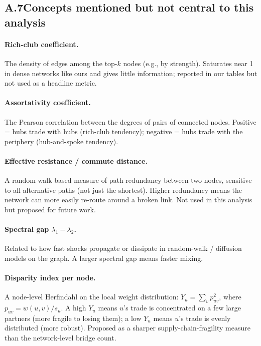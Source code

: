 \documentclass[11pt,a4paper]{article}
\begin{document}
\subsection*{A.7\quad Concepts mentioned but not central to this analysis}

\paragraph{Rich-club coefficient.}
The density of edges among the top-$k$ nodes (e.g., by strength). Saturates
near 1 in dense networks like ours and gives little information; reported
in our tables but not used as a headline metric.

\paragraph{Assortativity coefficient.}
The Pearson correlation between the degrees of pairs of connected
nodes. Positive = hubs trade with hubs (rich-club tendency); negative =
hubs trade with the periphery (hub-and-spoke tendency).

\paragraph{Effective resistance / commute distance.}
A random-walk-based measure of path redundancy between two nodes,
sensitive to all alternative paths (not just the shortest). Higher
redundancy means the network can more easily re-route around a broken
link. Not used in this analysis but proposed for future work.

\paragraph{Spectral gap $\lambda_1 - \lambda_2$.}
Related to how fast shocks propagate or dissipate in random-walk /
diffusion models on the graph. A larger spectral gap means faster
mixing.

\paragraph{Disparity index per node.}
A node-level Herfindahl on the local weight distribution:
$Y_u = \sum_{v} p_{uv}^2$, where $p_{uv} = w(u,v) / s_u$. A high
$Y_u$ means $u$'s trade is concentrated on a few large partners (more
fragile to losing them); a low $Y_u$ means $u$'s trade is evenly
distributed (more robust). Proposed as a sharper supply-chain-fragility
measure than the network-level bridge count.
\end{document}
